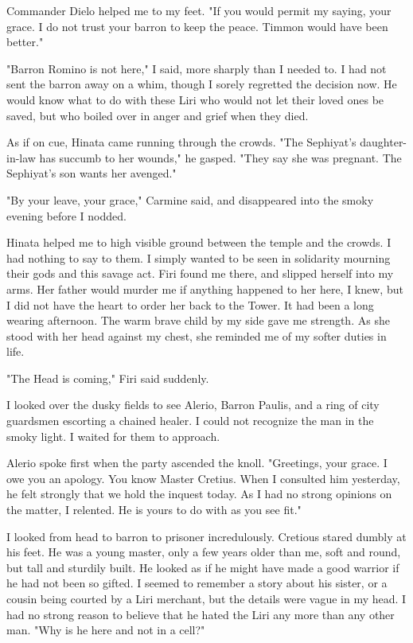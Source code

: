 \documentclass{article}
\begin{document}
Commander Dielo helped me to my feet. "If you would permit my saying, your grace. I do not trust your barron to keep the peace. Timmon would have been better."

"Barron Romino is not here," I said, more sharply than I needed to. I had not sent the barron away on a whim, though I sorely regretted the decision now. He would know what to do with these Liri who would not let their loved ones be saved, but who boiled over in anger and grief when they died.

As if on cue, Hinata came running through the crowds. "The Sephiyat's daughter-in-law has succumb to her wounds," he gasped. "They say she was pregnant. The Sephiyat's son wants her avenged." 

"By your leave, your grace," Carmine said, and disappeared into the smoky evening before I nodded. 

Hinata helped me to high visible ground between the temple and the crowds. I had nothing to say to them. I simply wanted to be seen in solidarity mourning their gods and this savage act. Firi found me there, and slipped herself into my arms. Her father would murder me if anything happened to her here, I knew, but I did not have the heart to order her back to the Tower. It had been a long wearing afternoon. The warm brave child by my side gave me strength. As she stood with her head against my chest, she reminded me of my softer duties in life.

"The Head is coming," Firi said suddenly.

I looked over the dusky fields to see Alerio, Barron Paulis, and a ring of city guardsmen escorting a chained healer. I could not recognize the man in the smoky light. I waited for them to approach.

Alerio spoke first when the party ascended the knoll. "Greetings, your grace. I owe you an apology. You know Master Cretius. When I consulted him yesterday, he felt strongly that we hold the inquest today. As I had no strong opinions on the matter, I relented. He is yours to do with as you see fit."

I looked from head to barron to prisoner incredulously. Cretious stared dumbly at his feet. He was a young master, only a few years older than me, soft and round, but tall and sturdily built. He looked as if he might have made a good warrior if he had not been so gifted. I seemed to remember a story about his sister, or a cousin being courted by a Liri merchant, but the details were vague in my head. I had no strong reason to believe that he hated the Liri any more than any other man. "Why is he here and not in a cell?"
\end{document}

